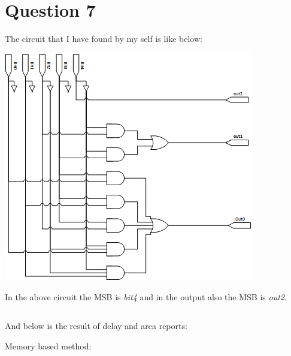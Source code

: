 \documentclass[paper=b4, fontsize=11pt]{scrartcl} %
\numberwithin{equation}{section} %
\numberwithin{figure}{section} %
\numberwithin{table}{section} %
\begin{document}
\section{Question 7}
The circuit that I have found by my self is like below:
\begin{center}
    \includegraphics{sqaure_root.png}
\end{center}

In the above circuit the MSB is \textit{bit4} and in the output also
the MSB is \textit{out2}.

\inputminted{vhdl}{q7/src/squareroot.vhd}


And below is the result of delay and area reports:

Memory based method:
\end{document}
